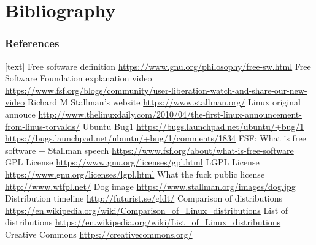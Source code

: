 \documentclass[xcolor={usenames,dvipsnames}]{beamer}
\newcommand{\sectiontitle}{}
\newcommand{\newHsection}[1]{\renewcommand{\sectiontitle}{#1}\section*{#1}}
\begin{document}
\newHsection{Bibliography}

\setcounter{framenumber}{\value{finalframe}}
\begin{frame}[allowframebreaks]
    \frametitle<presentation>{References}
    \begin{thebibliography}{10}
            [text]
            Free software definition
            \newblock \url{https://www.gnu.org/philosophy/free-sw.html}
            Free Software Foundation explanation video
            \newblock \url{https://www.fsf.org/blogs/community/user-liberation-watch-and-share-our-new-video}
            Richard M Stallman's website
            \newblock \url{https://www.stallman.org/}
            Linux original annouce
            \newblock
            \url{http://www.thelinuxdaily.com/2010/04/the-first-linux-announcement-from-linus-torvalds/}
            Ubuntu Bug1
            \newblock \url{https://bugs.launchpad.net/ubuntu/+bug/1}
            \newblock  \url{https://bugs.launchpad.net/ubuntu/+bug/1/comments/1834}
            FSF: What is free software + Stallman speech
            \newblock \url{https://www.fsf.org/about/what-is-free-software}
            GPL License
            \newblock \url{https://www.gnu.org/licenses/gpl.html}
            LGPL License
            \newblock \url{https://www.gnu.org/licenses/lgpl.html}
            What the fuck public license
            \newblock \url{http://www.wtfpl.net/}
            Dog image
            \newblock \url{https://www.stallman.org/images/dog.jpg}
            Distribution timeline
            \newblock \url{http://futurist.se/gldt/}
            Comparison of distributions
            \newblock \url{https://en.wikipedia.org/wiki/Comparison\_of\_Linux\_distributions}
            List of distributions
            \newblock \url{https://en.wikipedia.org/wiki/List\_of\_Linux\_distributions}
            Creative Commons
            \newblock \url{https://creativecommons.org/}

\end{thebibliography}
\end{frame}
\end{document}
